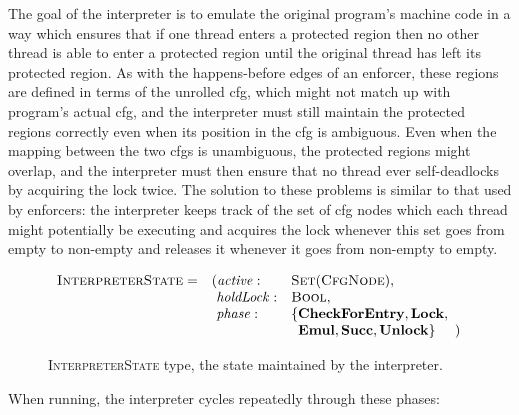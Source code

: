  The goal of the interpreter is to emulate the original
program's machine code in a way which ensures that if one thread
enters a protected region then no other thread is able to enter a
protected region until the original thread has left its protected
region.  As with the happens-before edges of an
enforcer, these regions are defined in terms of the
unrolled \gls{cfg}, which might not match up with program's actual \gls{cfg}, and
the interpreter must still maintain the protected regions correctly
even when its position in the \gls{cfg} is ambiguous.  Even when the mapping
between the two \glspl{cfg} is unambiguous, the protected regions might
overlap, and the interpreter must then ensure that no thread ever
self-deadlocks by acquiring the lock twice.  The solution to these
problems is similar to that used by enforcers: the interpreter keeps
track of the set of \gls{cfg} nodes which each thread might potentially be
executing and acquires the lock whenever this set goes from empty to
non-empty and releases it whenever it goes from non-empty to empty.

\begin{figure}
  \begin{displaymath}
    \begin{array}{llll}
      \textsc{InterpreterState} = & (\mathit{active}: &\textsc{Set}(\textsc{CfgNode}), &\\
      & \,\,\mathit{holdLock}: &\textsc{Bool},\\
      & \,\,\mathit{phase}: & \{\mathbf{CheckForEntry}, \mathbf{Lock}, \\
      &                     & \,\,\,\mathbf{Emul}, \mathbf{Succ}, \mathbf{Unlock}\} &\!\!\!)\\
    \end{array}
  \end{displaymath}
  \caption{\textsc{InterpreterState} type, the state maintained by the
    interpreter.}
  \label{fig:fix_bugs:interpreter_state}
\end{figure}

When running, the interpreter cycles repeatedly through these phases:


